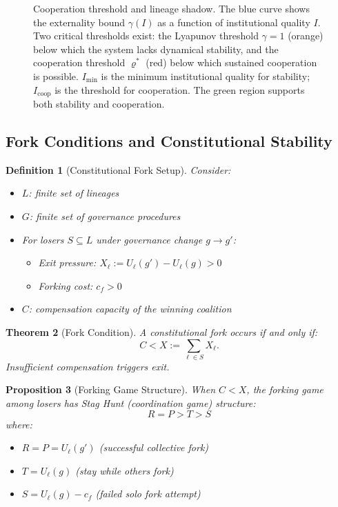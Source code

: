 \documentclass[12pt]{article}
\newtheorem{theorem}{Theorem}[section]
\newtheorem{proposition}[theorem]{Proposition}
\newtheorem{definition}[theorem]{Definition}
\begin{document}
\begin{figure}[h]
\begin{tikzpicture}[scale=4.5, >=Stealth]
\end{tikzpicture}
\caption{Cooperation threshold and lineage shadow. The blue curve shows the externality bound $\gamma(I)$ as a function of institutional quality $I$. Two critical thresholds exist: the Lyapunov threshold $\gamma = 1$ (orange) below which the system lacks dynamical stability, and the cooperation threshold $\varrho^*$ (red) below which sustained cooperation is possible. $I_{\min}$ is the minimum institutional quality for stability; $I_{\text{coop}}$ is the threshold for cooperation. The green region supports both stability and cooperation.}
\label{fig:cooperation-threshold}
\end{figure}

\subsection{Fork Conditions and Constitutional Stability}

\begin{definition}[Constitutional Fork Setup]
Consider:
\begin{itemize}
    \item $L$: finite set of lineages
    \item $G$: finite set of governance procedures
    \item For losers $S \subseteq L$ under governance change $g \to g'$:
    \begin{itemize}
        \item Exit pressure: $X_\ell := U_\ell(g') - U_\ell(g) > 0$
        \item Forking cost: $c_f > 0$
    \end{itemize}
    \item $C$: compensation capacity of the winning coalition
\end{itemize}
\end{definition}

\begin{theorem}[Fork Condition]
\label{thm:fork-condition}
A constitutional fork occurs if and only if:
\[
C < X := \sum_{\ell \in S} X_\ell.
\]
Insufficient compensation triggers exit.
\end{theorem}

\begin{proposition}[Forking Game Structure]
\label{prop:forking-game}
When $C < X$, the forking game among losers has Stag Hunt (coordination game) structure:
\[
R = P > T > S
\]
where:
\begin{itemize}
    \item $R = P = U_\ell(g')$ (successful collective fork)
    \item $T = U_\ell(g)$ (stay while others fork)
    \item $S = U_\ell(g) - c_f$ (failed solo fork attempt)
\end{itemize}
\end{proposition}
\end{document}
